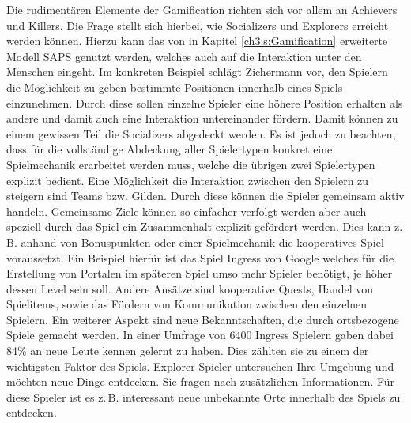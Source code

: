 Die rudimentären Elemente der Gamification richten sich vor allem an Achievers und Killers.
Die Frage stellt sich hierbei, wie Socializers und Explorers erreicht werden können.
Hierzu kann das von \cite{Zichermann.2011} in Kapitel \ref{ch3:s:Gamification} erweiterte Modell SAPS genutzt werden, welches auch auf die Interaktion unter den Menschen eingeht. Im konkreten Beispiel schlägt Zichermann vor, den Spielern die Möglichkeit zu geben bestimmte Positionen innerhalb eines Spiels einzunehmen. Durch diese sollen einzelne Spieler eine höhere Position erhalten als andere und damit auch eine Interaktion untereinander fördern. Damit können zu einem gewissen Teil die Socializers abgedeckt werden.
Es ist jedoch zu beachten, dass für die vollständige Abdeckung aller Spielertypen konkret eine Spielmechanik erarbeitet werden muss, welche die übrigen zwei Spielertypen explizit bedient. Eine Möglichkeit die Interaktion zwischen den Spielern zu steigern sind Teams bzw. Gilden. Durch diese können die Spieler gemeinsam aktiv handeln. Gemeinsame Ziele können so einfacher verfolgt werden aber auch speziell durch das Spiel ein Zusammenhalt explizit gefördert werden. Dies kann z.\,B. anhand von Bonuspunkten oder einer Spielmechanik die kooperatives Spiel voraussetzt. Ein Beispiel hierfür ist das Spiel Ingress von Google welches für die Erstellung von Portalen im späteren Spiel umso mehr Spieler benötigt, je höher dessen Level sein soll.\cite{Celino.2013}
Andere Ansätze sind kooperative Quests, Handel von Spielitems, sowie das Fördern von Kommunikation zwischen den einzelnen Spielern. \cite{Caon.2013} Ein weiterer Aspekt sind neue Bekanntschaften, die durch ortsbezogene Spiele gemacht werden. In einer Umfrage von 6400 Ingress Spielern gaben dabei 84\% an neue Leute kennen gelernt zu haben. Dies zählten sie zu einem der wichtigsten Faktor des Spiels.\cite{Ingress.2014}
Explorer-Spieler untersuchen Ihre Umgebung und möchten neue Dinge entdecken. Sie fragen nach zusätzlichen Informationen. Für diese Spieler ist es z.\,B. interessant neue unbekannte Orte innerhalb des Spiels zu entdecken.

